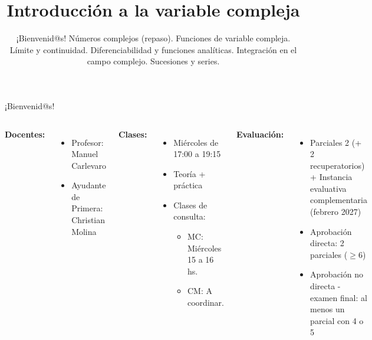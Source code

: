 \documentclass[9pt, aspectratio=169]{beamer}
\title{Introducción a la variable compleja}
\subtitle{¡Bienvenid@s! Números complejos (repaso). Funciones de variable compleja. Límite y continuidad. Diferenciabilidad y funciones analíticas. Integración en el campo complejo. Sucesiones y series.}
\begin{document}
\maketitle

\begin{frame}{ ¡Bienvenid@s! }
	\begin{columns}[c]
		\cx
		\textbf{Docentes:}
		\begin{itemize}
			\item Profesor: Manuel Carlevaro
			\item Ayudante de Primera: Christian Molina
		\end{itemize}
		\vspace{1em}

		\textbf{Clases:}
		\begin{itemize}
			\item Miércoles de 17:00 a 19:15
			\item Teoría + práctica
			\item Clases de consulta:
			      \begin{itemize}
				      \item MC: Miércoles 15 a 16 hs.
				      \item CM: A coordinar.
			      \end{itemize}
		\end{itemize}
		\cx
		\textbf{Evaluación:}
		\begin{itemize}
			\item Parciales 2 (+ 2 recuperatorios) + Instancia evaluativa complementaria (febrero 2027)
			\item Aprobación directa: 2 parciales ($\geq 6$)
			\item Aprobación no directa - examen final: al menos un parcial con 4 o 5
		\end{itemize}
	\end{columns}
\end{frame}
\end{document}
